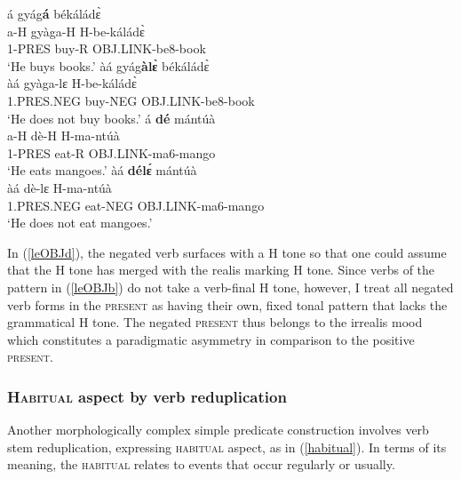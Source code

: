 \begin{exe}
\ex\label{leOBJ}
\begin{multicols}{2}
\begin{xlist}
\ex \label{leOBJa}
  \glll  á gyág{\bfseries á} békáládɛ̀ \\
         a-H gyàga-H H-be-káládɛ̀ \\
         1-PRES buy-R OBJ.LINK-be8-book    \\
    \trans `He buys books.'
\ex \label{leOBJb}
  \glll  àá gyág{\bfseries àlɛ̀} békáládɛ̀\\
         àá gyàga-lɛ H-be-káládɛ̀ \\
         1.PRES.NEG buy-NEG OBJ.LINK-be8-book    \\
    \trans `He does not buy books.'
\ex\label{leOBJc}
  \glll  á {\bfseries dé} mántúà \\
          a-H dè-H H-ma-ntúà \\
           1-PRES eat-R OBJ.LINK-ma6-mango   \\
    \trans `He eats mangoes.'
\ex \label{leOBJd} 
  \glll  àá {\bfseries délɛ́} mántúà \\
          àá dè-lɛ H-ma-ntúà \\
           1.PRES.NEG eat-NEG OBJ.LINK-ma6-mango   \\
    \trans `He does not eat mangoes.'
\end{xlist}
\end{multicols}
\end{exe}


\noindent In (\ref{leOBJd}), the negated verb surfaces with a H tone so that one could assume that the H tone has merged with the realis marking H tone. Since verbs of the pattern in (\ref{leOBJb}) do not take a verb-final H tone, however, I treat all negated verb forms in the \textsc{present} as having their own, fixed tonal pattern that lacks the grammatical H tone. The negated \textsc{present} thus belongs to the irrealis mood which constitutes a paradigmatic asymmetry in comparison to the positive \textsc{present}.









\subsubsection{\textsc{Habitual} aspect by verb reduplication}
\label{sec:HAB}

Another morphologically complex simple predicate construction involves verb stem reduplication, expressing \textsc{habitual} aspect, as in (\ref{habitual}). In terms of its meaning, the \textsc{habitual} relates to events that occur regularly or usually.

